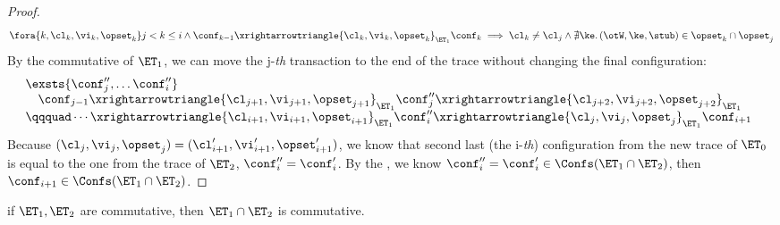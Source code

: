 \begin{proof}
\[
    \fora{k, \cl_k, \vi_k, \opset_k} j < k \leq i \land \conf_{k-1} \xrightarrowtriangle{\cl_k, \vi_k, \opset_k}_{\ET_{1}} \conf_k \implies \cl_k \neq \cl_j \land \nexists{\ke} \ldotp (\otW, \ke, \stub) \in \opset_k \cap \opset_j
\]
By the commutative of \( \ET_1 \), we can move the j-\emph{th} transaction to the end of the trace without changing the final configuration:
\[
\begin{array}{@{}l}
    \exsts{\conf''_{j}, \dots \conf''_i}  \\
    \quad \conf_{j-1} \xrightarrowtriangle{\cl_{j+1}, \vi_{j+1}, \opset_{j+1}}_{\ET_{1}} \conf''_{j} \xrightarrowtriangle{\cl_{j+2}, \vi_{j+2}, \opset_{j+2}}_{\ET_{1}} \\
    \qqquad \cdots \xrightarrowtriangle{\cl_{i+1}, \vi_{i+1}, \opset_{i+1}}_{\ET_{1}} \conf''_i \xrightarrowtriangle{\cl_{j}, \vi_{j}, \opset_{j}}_{\ET_{1}} \conf_{i+1}
\end{array}
\]
Because \( (\cl_{j}, \vi_{j}, \opset_{j}) = (\cl'_{i+1}, \vi'_{i+1}, \opset'_{i+1}) \), we know that second last (the i-\emph{th}) configuration from the new trace of \( \ET_0 \) is equal to the one from the trace of \( \ET_2 \), \ie \( \conf''_i = \conf'_i \).
By the \ih, we know \( \conf''_i = \conf'_i \in \Confs(\ET_1 \cap \ET_2) \), then \( \conf_{i+1} \in \Confs(\ET_1 \cap \ET_2)\).
\end{proof}

\begin{proposition}
\label{thm:appendix-et-composition-2}
if $\ET_1, \ET_2$ are commutative, then $\ET_1 \cap \ET_2$ is commutative.
\end{proposition}
